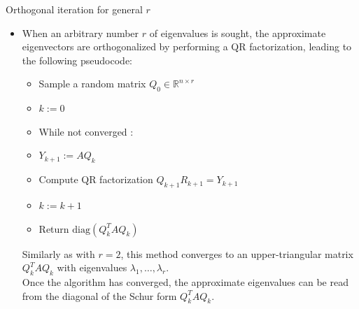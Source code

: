 \documentclass[t,usepdftitle=false]{beamer}
\begin{document}
\begin{frame}{Orthogonal iteration for general $r$}
\begin{itemize}
\item When an arbitrary number $r$ of eigenvalues is sought, the approximate eigenvectors are orthogonalized by performing a QR factorization, leading to the following pseudocode:\vspace{.2cm}
\begin{itemize}
\item[1.] Sample a random matrix $Q_0\in\mathbb{R}^{n\times r}$\vspace{.07cm}
\item[2.] $k:=0$\vspace{.07cm}
\item[3.] While not converged :\vspace{.07cm}
\item[4.]\hspace{.4cm}$Y_{k+1}:=AQ_k$\vspace{.07cm}
\item[5.]\hspace{.4cm}Compute QR factorization $Q_{k+1}R_{k+1}=Y_{k+1}$\vspace{.07cm}
\item[6.]\hspace{.4cm}$k:=k+1$\vspace{.07cm}
\item[7.] Return $\mathrm{diag}(Q_k^TAQ_k)$\vspace{.2cm}
\end{itemize}
Similarly as with $r=2$, this method converges to an upper-triangular matrix $Q_k^TAQ_k$ with eigenvalues $\lambda_1,\dots,\lambda_r$.\vspace{.1cm}\\
Once the algorithm has converged, the approximate eigenvalues can be read from the diagonal of the Schur form  $Q_k^TAQ_k$.
\end{itemize}
\end{frame}
\end{document}
